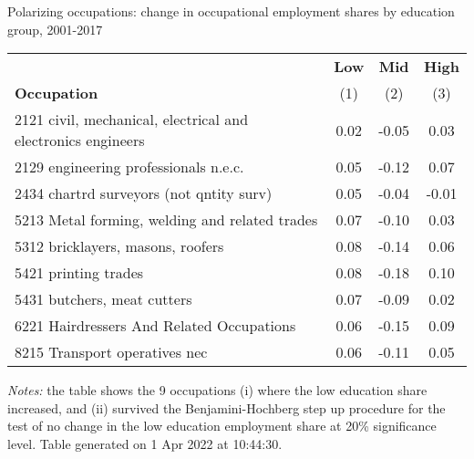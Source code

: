 \begin{center}
\begin{threeparttable}[!h]
\caption{Polarizing occupations: change in occupational employment shares by education group, 2001-2017}
\label{tab:pol_occ}
\begin{tabular}{lccc}
\toprule
\toprule
&\multicolumn{1}{c}{\textbf{Low}}&\multicolumn{1}{c}{\textbf{Mid}}&\multicolumn{1}{c}{\textbf{High}} \\
\textbf{Occupation}&\multicolumn{1}{c}{(1)}&\multicolumn{1}{c}{(2)}&\multicolumn{1}{c}{(3)} \\
\midrule
2121 civil, mechanical, electrical and electronics engineers&        0.02&       -0.05&        0.03\\
2129 engineering professionals n.e.c.&        0.05&       -0.12&        0.07\\
2434 chartrd surveyors (not qntity surv)&        0.05&       -0.04&       -0.01\\
5213 Metal forming, welding and related trades&        0.07&       -0.10&        0.03\\
5312 bricklayers, masons, roofers&        0.08&       -0.14&        0.06\\
5421 printing trades&        0.08&       -0.18&        0.10\\
5431 butchers, meat cutters&        0.07&       -0.09&        0.02\\
6221 Hairdressers And Related Occupations&        0.06&       -0.15&        0.09\\
8215 Transport operatives nec&        0.06&       -0.11&        0.05\\
\bottomrule
\bottomrule
\end{tabular}
\begin{tablenotes}
\item \footnotesize \textit{Notes:} the table shows the 9 occupations (i) where the low education share increased, and (ii) survived the Benjamini-Hochberg step up procedure for the test of no change in the low education employment share at 20\% significance level. Table generated on  1 Apr 2022 at 10:44:30.
\end{tablenotes}
\end{threeparttable}
\end{center}
